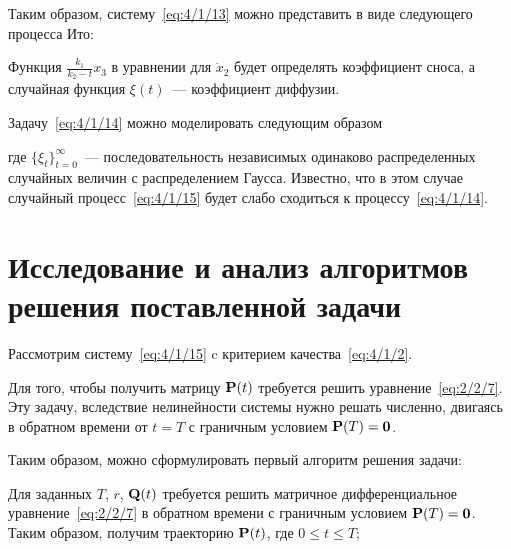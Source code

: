 Таким образом, систему~\ref{eq:4/1/13} можно представить в виде следующего процесса Ито:

\eeq

Функция $\frac{k_1}{k_2 - t} x_3$ в уравнении для $\dot{x}_2$ будет определять коэффициент сноса, а случайная функция $\xi(t)$~--- коэффициент диффузии.

Задачу~\ref{eq:4/1/14} можно моделировать следующим образом

\eeq

где $\{\xi_t\}_{t=0}^\infty$~--- последовательность независимых одинаково распределенных случайных величин с распределением Гаусса. Известно\cite{ARKHIPOV}, что в этом случае случайный процесс~\ref{eq:4/1/15} будет слабо сходиться к процессу~\ref{eq:4/1/14}.



\section{Исследование и анализ алгоритмов решения поставленной задачи}



Рассмотрим систему~\ref{eq:4/1/15} c критерием качества~\ref{eq:4/1/2}.

Для того, чтобы получить матрицу $\mathbf{P}(t)$ требуется решить уравнение~\vref{eq:2/2/7}. Эту задачу, вследствие нелинейности системы нужно решать численно, двигаясь в обратном времени от $t=T$ с граничным условием $\mathbf{P}(T) = \mathbf{0}$.

Таким образом, можно сформулировать первый алгоритм решения задачи:

    \benum
        \item
            Для заданных $T$, $r$, $\mathbf{Q}(t)$ требуется решить матричное дифференциальное уравнение~\ref{eq:2/2/7} в обратном времени с граничным условием $\mathbf{P}(T) = \mathbf{0}$. Таким образом, получим траекторию $\mathbf{P}(t)$, где $0 \leqslant t \leqslant T$;

